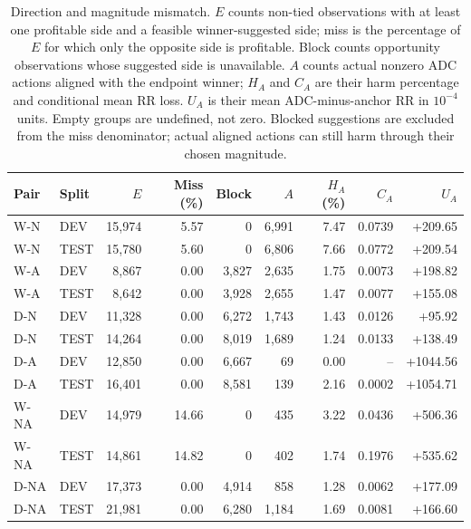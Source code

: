\begin{table}[htbp]
\centering\footnotesize\setlength{\tabcolsep}{4pt}
\caption{Direction and magnitude mismatch. $E$ counts non-tied observations with at least one profitable side and a feasible winner-suggested side; miss is the percentage of $E$ for which only the opposite side is profitable. Block counts opportunity observations whose suggested side is unavailable. $A$ counts actual nonzero ADC actions aligned with the endpoint winner; $H_A$ and $C_A$ are their harm percentage and conditional mean RR loss. $U_A$ is their mean ADC-minus-anchor RR in $10^{-4}$ units. Empty groups are undefined, not zero. Blocked suggestions are excluded from the miss denominator; actual aligned actions can still harm through their chosen magnitude.}
\label{tab:winner-alignment}
\begin{tabular}{llrrrrrrr}
\toprule
Pair & Split & $E$ & Miss (\%) & Block & $A$ & $H_A$ (\%) & $C_A$ & $U_A$\\
\midrule
W-N & DEV & 15,974 & 5.57 & 0 & 6,991 & 7.47 & 0.0739 & +209.65\\
W-N & TEST & 15,780 & 5.60 & 0 & 6,806 & 7.66 & 0.0772 & +209.54\\
W-A & DEV & 8,867 & 0.00 & 3,827 & 2,635 & 1.75 & 0.0073 & +198.82\\
W-A & TEST & 8,642 & 0.00 & 3,928 & 2,655 & 1.47 & 0.0077 & +155.08\\
D-N & DEV & 11,328 & 0.00 & 6,272 & 1,743 & 1.43 & 0.0126 & +95.92\\
D-N & TEST & 14,264 & 0.00 & 8,019 & 1,689 & 1.24 & 0.0133 & +138.49\\
D-A & DEV & 12,850 & 0.00 & 6,667 & 69 & 0.00 & -- & +1044.56\\
D-A & TEST & 16,401 & 0.00 & 8,581 & 139 & 2.16 & 0.0002 & +1054.71\\
W-NA & DEV & 14,979 & 14.66 & 0 & 435 & 3.22 & 0.0436 & +506.36\\
W-NA & TEST & 14,861 & 14.82 & 0 & 402 & 1.74 & 0.1976 & +535.62\\
D-NA & DEV & 17,373 & 0.00 & 4,914 & 858 & 1.28 & 0.0062 & +177.09\\
D-NA & TEST & 21,981 & 0.00 & 6,280 & 1,184 & 1.69 & 0.0081 & +166.60\\
\bottomrule
\end{tabular}
\end{table}
